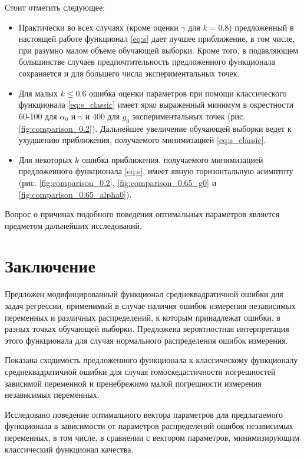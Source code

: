 \documentclass[tikz,10pt,a4paper]{article}
\begin{document}
Стоит отметить следующее:
\begin{itemize}
  \item Практически во всех случаях (кроме оценки $\gamma$ для $k = 0.8$)
	предложенный в настоящей работе функционал \eqref{eq:s}
	дает лучшее приближение, в том числе, при разумно малом объеме обучающей выборки. Кроме того, в
	подавляющем большинстве случаев предпочтительность предложенного функционала
	сохраняется и для большего числа экспериментальных точек.
  \item Для малых $k \leq 0.6$ ошибка оценки параметров при помощи классического
	функционала \eqref{eq:s_classic} имеет ярко выраженный минимум в окрестности 60-100
	для $\alpha_0$ и $\gamma$ и 400 для $g_0$ экспериментальных точек
	(рис. \ref{fig:comparison_0.2}).
	Дальнейшее увеличение обучающей выборки ведет к ухудшению приближения, получаемого
	минимизацией \eqref{eq:s_classic}.
  \item Для некоторых $k$ ошибка приближения, получаемого минимизацией предложенного
	функционала \eqref{eq:s}, имеет явную горизонтальную асимптоту (рис. \ref{fig:comparison_0.2},
	\ref{fig:comparison_0.65_g0} и \ref{fig:comparison_0.65_alpha0}).
\end{itemize}

Вопрос о причинах подобного поведения оптимальных параметров является предметом
дальнейших исследований.

\section{Заключение}

Предложен модифицированный функционал среднеквадратичной ошибки для задач
регрессии, применимый в случае наличия ошибок измерения независимых
переменных и различных распределений, к которым принадлежат ошибки, в разных
точках обучающей выборки. Предложена вероятностная интерпретация этого
функционала для случая нормального распределения ошибок измерения.

Показана сходимость предложенного функционала к классическому функционалу
среднеквадратичной ошибки для случая гомоскедастичности погрешностей
зависимой переменной и пренебрежимо малой погрешности измерения независимых
переменных.

Исследовано поведение оптимального вектора параметров для предлагаемого
функционала в зависимости от параметров распределений ошибок независимых
переменных, в том числе, в сравнении с вектором параметров, минимизирующим
классический функционал качества.
\end{document}
